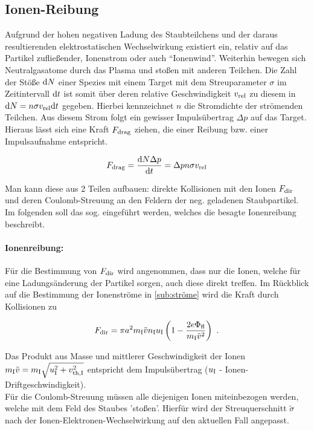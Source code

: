   \subsection{Ionen-Reibung}\label{subsub:reibung}

    Aufgrund der hohen negativen Ladung des Staubteilchens und der daraus resultierenden elektrostatischen Wechselwirkung existiert ein, relativ auf das Partikel zufließender, Ionenstrom oder auch "`Ionenwind"'. Weiterhin bewegen sich Neutralgasatome durch das Plasma und stoßen mit anderen Teilchen. Die Zahl der Stöße $\textnormal{d} N$ einer Spezies mit einem Target mit dem Streuparameter $\sigma$ im Zeitintervall $\textnormal{d} t$ ist somit über deren relative Geschwindigkeit $v_\text{rel}$ zu diesem in $\textnormal{d} N=n\sigma v_\text{rel}\textnormal{d} t$ gegeben. Hierbei kennzeichnet $n$ die Stromdichte der strömenden Teilchen. Aus diesem Strom folgt ein gewisser Impulsübertrag $\Delta p$ auf das Target. Hieraus lässt sich eine Kraft $F_\text{drag}$ ziehen, die einer Reibung bzw. einer Impulsaufnahme entspricht.

      \begin{align}
        F_\text{drag}=\frac{\textnormal{d} N \Delta p}{\textnormal{d} t}=\Delta p n \sigma v_\text{rel}
      \end{align}

     Man kann diese aus 2 Teilen aufbauen: direkte Kollisionen mit den Ionen $F_\text{dir}$ und deren Coulomb-Streuung an den Feldern der neg. geladenen Staubpartikel. Im folgenden soll das sog.  eingeführt werden, welches die besagte Ionenreibung beschreibt.

      \paragraph{Ionenreibung: }

      Für die Bestimmung von $F_\text{dir}$ wird angenommen, dass nur die Ionen, welche für eine Ladungsänderung der Partikel sorgen, auch diese direkt treffen. Im Rückblick auf die Bestimmung der Ionenströme in \ref{sub:ströme} wird die Kraft durch Kollisionen zu

        \begin{align}
          F_\text{dir}=\pi a^2m_\text{I}\tilde{v}n_\text{I}u_\text{I}\left(1-\frac{2e\Phi_\text{fl}}{m_\text{I}\tilde{v}^2}\right)\,\,.
        \end{align}


      Das Produkt aus Masse und mittlerer Geschwindigkeit der Ionen $m_\text{I}\tilde{v}=m_\text{I}\sqrt{u_\text{I}^2+v_\text{th,I}^2}$ entspricht dem Impulsübertrag ($u_\text{I}$ - Ionen-Driftgeschwindigkeit).\\
      Für die Coulomb-Streuung müssen alle diejenigen Ionen miteinbezogen werden, welche mit dem Feld des Staubes 'stoßen'. Hierfür wird der Streuquerschnitt $\tilde{\sigma}$ nach \cite{Barnes92} der Ionen-Elektronen-Wechselwirkung auf den aktuellen Fall angepasst.

